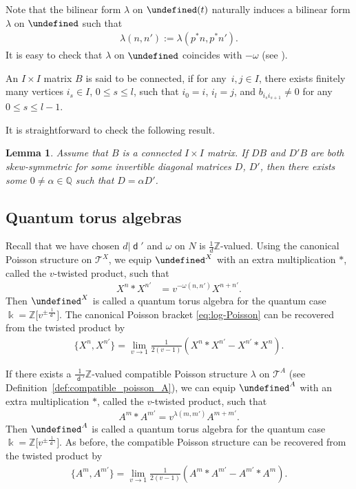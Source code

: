 \documentclass[10pt,a4paper]{amsart}
\newcommand{\kk}{\Bbbk}
\newcommand{\Z}{\mathbb{Z}}
\newcommand{\Q}{\mathbb{Q}}
\newcommand{\opname}[1]{\operatorname{\mathsf{#1}}}
\newcommand{\cT}{{\mathcal T}}
\newcommand{\torus}{\cT}%
\newcommand{\diag}{{\delta}}
\renewcommand{\diag}{{d}}
\let\Mc\undefined
\let\Nufv\undefined
\let\LP\undefined
\newcommand{\Mc}{M^\circ}
\newcommand{\Nufv}{N_{\opname{uf}}}
\newcommand{\LP}{{\mathcal{LP}}}
\renewcommand{\diag}{\opname{d}'}
\numberwithin{equation}{section}
\newtheorem{Lemma}[Theorem]{Lemma}
\begin{document}
Note that the bilinear form $\lambda$ on $\Mc(t)$ naturally induces
a bilinear form $\lambda$ on $\Nufv$ such that
\begin{gather*}
\lambda(n,n') :=\lambda(p^{*}n,p^{*}n').
\end{gather*}
It is easy to check that $\lambda$ on $\Nufv$ coincides with $-\omega$
(see \cite[Lemma 2.1.11\,(2)]{qin2020dual}).

\begin{Definition}\label{def:connected_matrix}
An $I\times I$ matrix $B$ is said to be connected, if for any~$i,j\in I$,
there exists finitely many vertices $i_{s}\in I$, $0\leq s\leq l$,
such that $i_{0}=i$, $i_{l}=j$, and $b_{i_{s}i_{s+1}}\neq0$ for
any $0\leq s\leq l-1$.
\end{Definition}

It is straightforward to check the following result.

\begin{Lemma}\label{lem:connected_symmetrizer}
Assume that $B$ is a connected $I\times I$ matrix. If $DB$
and $D'B$ are both skew-symmetric for some invertible diagonal matrices
$D$, $D'$, then there exists some $0\neq\alpha\in\Q$ such that
$D=\alpha D'$.
\end{Lemma}

\subsection{Quantum torus algebras}\label{sec:quantization}

Recall that we have chosen $d|\diag$ and $\omega$ on $N$ is $\frac{1}{d}\Z$-valued. Using the
canonical Poisson structure on $\torus^{X}$, we equip $\LP^{X}$ with an extra multiplication $*$, called the $v$-twisted product, such
that
\begin{align*}
X^{n}*X^{n'} & =v^{-\omega(n,n')}X^{n+n'}.
\end{align*}
Then $\LP^{X}$ is called a quantum torus algebra for the quantum case $\kk=\Z\big[v^{\pm\frac{1}{\diag}}\big]$. The canonical Poisson bracket
\eqref{eq:log-Poisson} can be recovered from the twisted product
by
\begin{align*}
\bigl\{X^{n},X^{n'}\bigr\} =\lim_{v\rightarrow1}\frac{1}{2(v-1)}(X^{n}*X^{n'}-X^{n'}*X^{n}).
\end{align*}

If there exists a $\frac{1}{\diag}\Z$-valued compatible Poisson structure
$\lambda$ on $\torus^{A}$ (see Definition~\ref{def:compatible_poisson_A}), we can equip $\LP^{A}$ with an extra multiplication $*$, called the $v$-twisted product, such that
\begin{align*}
 A^{m}*A^{m'} =v^{\lambda(m,m')}A^{m+m'}.
 \end{align*}
Then $\LP^{A}$ is called a quantum torus algebra for the quantum case $\kk=\Z\big[v^{\pm\frac{1}{\diag}}\big]$. As before, the compatible Poisson structure can be recovered from the twisted product
by
\begin{align*}
\bigl\{A^{m},A^{m'}\bigr\} =\lim_{v\rightarrow1}\frac{1}{2(v-1)}(A^{m}*A^{m'}-A^{m'}*A^{m}).
\end{align*}
\end{document}
